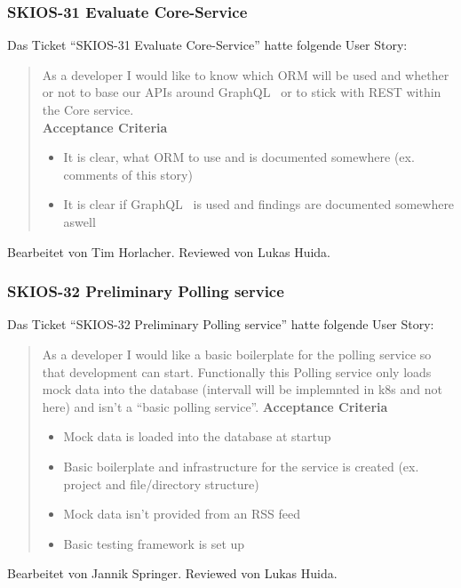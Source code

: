 \subsubsection{SKIOS-31 Evaluate Core-Service}
Das Ticket \enquote{SKIOS-31 Evaluate Core-Service} hatte folgende User Story:
\begin{quotation}
    As a developer I would like to know which ORM will be used and whether or not to base our APIs around GraphQL~\parencite{web/GraphQL} or to stick with REST within the Core service. \\
    \textbf{Acceptance Criteria}
    \begin{itemize}
        \item It is clear, what ORM to use and is documented somewhere (ex. comments of this story)
        \item It is clear if GraphQL~\parencite{web/GraphQL} is used and findings are documented somewhere aswell
    \end{itemize}
\end{quotation}
Bearbeitet von Tim Horlacher.
Reviewed von Lukas Huida.

\subsubsection{SKIOS-32 Preliminary Polling service}
Das Ticket \enquote{SKIOS-32 Preliminary Polling service} hatte folgende User Story:
\begin{quotation}
    As a developer I would like a basic boilerplate for the polling service so that development can start.
    Functionally this Polling service only loads mock data into the database (intervall will be implemnted in k8s and not here) and isn't a \enquote{basic polling service}.
\textbf{Acceptance Criteria}
\begin{itemize}
    \item Mock data is loaded into the database at startup
    \item Basic boilerplate and infrastructure for the service is created (ex. project and file/directory structure)
    \item Mock data isn't provided from an RSS feed 
    \item Basic testing framework is set up
\end{itemize}
\end{quotation}
Bearbeitet von Jannik Springer.
Reviewed von Lukas Huida.

